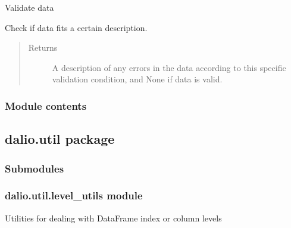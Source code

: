 \documentclass[letterpaper,10pt,english]{sphinxmanual}
\begin{document}
\begin{fulllineitems}
\begin{fulllineitems}
\label{\detokenize{dalio.validator:dalio.validator.validator.Validator.validate}}
Validate data

Check if data fits a certain description.
\begin{quote}\begin{description}
\item[{Returns}] \leavevmode
A description of any errors in the data according to this
specific validation condition, and None if data is valid.

\end{description}\end{quote}

\end{fulllineitems}


\end{fulllineitems}



\subsubsection{Module contents}
\label{\detokenize{dalio.validator:module-dalio.validator}}\label{\detokenize{dalio.validator:module-contents}}

\subsection{dalio.util package}
\label{\detokenize{dalio.util:dalio-util-package}}\label{\detokenize{dalio.util::doc}}

\subsubsection{Submodules}
\label{\detokenize{dalio.util:submodules}}

\subsubsection{dalio.util.level\_utils module}
\label{\detokenize{dalio.util:module-dalio.util.level_utils}}\label{\detokenize{dalio.util:dalio-util-level-utils-module}}
Utilities for dealing with DataFrame index or column levels
\end{document}
